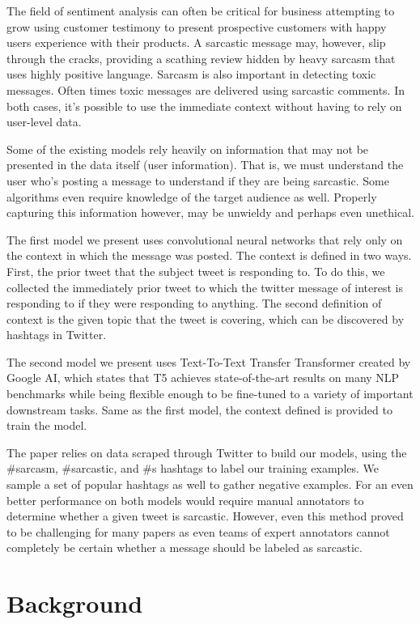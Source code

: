 \documentclass[11pt,a4paper]{article}
\begin{document}
The field of sentiment analysis can often be critical for business attempting to grow using customer testimony to present prospective customers with happy users experience with their products. A sarcastic message may, however, slip through the cracks, providing a scathing review hidden by heavy sarcasm that uses highly positive language. Sarcasm is also important in detecting toxic messages. Often times toxic messages are delivered using sarcastic comments. In both cases, it's possible to use the immediate context without having to rely on user-level data.

Some of the existing models rely heavily on information that may not be presented in the data itself (user information). That is, we must understand the user who's posting a message to understand if they are being sarcastic. Some algorithms even require knowledge of the target audience as well. Properly capturing this information however, may be unwieldy and perhaps even unethical. 

The first model we present uses convolutional neural networks that rely only on the context in which the message was posted. The context is defined in two ways. First, the prior tweet that the subject tweet is responding to. To do this, we collected the immediately prior tweet to which the twitter message of interest is responding to if they were responding to anything. The second definition of context is the given topic that the tweet is covering, which can be discovered by hashtags in Twitter.

The second model we present uses Text-To-Text Transfer Transformer created by Google AI, which states that T5 achieves state-of-the-art results on many NLP benchmarks while being flexible enough to be fine-tuned to a variety of important downstream tasks. Same as the first model, the context defined is provided to train the model. 

The paper relies on data scraped through Twitter to build our models, using the \#sarcasm, \#sarcastic, and \#s hashtags to label our training examples. We sample a set of popular hashtags as well to gather negative examples. For an even better performance on both models would require manual annotators to determine whether a given tweet is sarcastic. However, even this method proved to be challenging for many papers as even teams of expert annotators cannot completely be certain whether a message should be labeled as sarcastic.

\section{Background}
\end{document}
